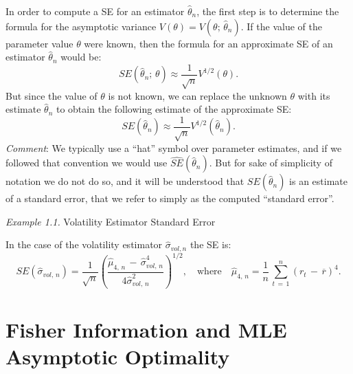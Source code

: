 \documentclass[graybox,envcountchap,sectrefs]{svmono}\usepackage[]{graphicx}\usepackage[]{xcolor}
\begin{document}
\begin{appendices}
In order to compute a SE for an estimator $\hat{\theta}_{n}$, the
first step is to determine the formula for the asymptotic variance
$V\left(\theta\right)=V\left(\theta;\,\hat{\theta}_{n}\right)$. If
the value of the parameter value $\theta$ were known, then the formula
for an approximate SE of an estimator $\hat{\theta}_{n}$ would be:
\begin{equation}
SE\left(\hat{\theta}_{n};\,\theta\right)\approx\frac{1}{\sqrt{n}}V^{1/2}(\theta).
\end{equation}
But since the value of $\theta$ is not known, we can replace the
unknown $\theta$ with its estimate $\hat{\theta}_{n}$ to obtain
the following estimate of the approximate SE:
\begin{equation}
SE\left(\hat{\theta}_{n}\right)\approx\frac{1}{\sqrt{n}}V^{1/2}(\hat{\theta}_{n}).\label{eq: afsSE}
\end{equation}
\emph{Comment}: We typically use a ``hat'' symbol over parameter
estimates, and if we followed that convention we would use $\widehat{SE}\left(\hat{\theta}_{n}\right)$.
But for sake of simplicity of notation we do not do so, and it will
be understood that $SE\left(\hat{\theta}_{n}\right)$ is an estimate
of a standard error, that we refer to simply as the computed ``standard
error''.

\medskip{}

\emph{Example 1.1.} Volatility Estimator Standard Error

In the case of the volatility estimator $\hat{\sigma}_{vol,n}$ the
SE is:
\begin{equation}
SE\left(\hat{\sigma}_{vol,\,n}\right)=\frac{1}{\sqrt{n}}\left(\dfrac{\hat{\mu}_{4,\,n}\,-\,\hat{\sigma}_{vol,\,n}^{4}}{4\hat{\sigma}_{vol,\,n}^{2}}\right)^{1/2},\quad\mathrm{where}\quad\hat{\mu}_{4,\,n}=\frac{1}{n}\,\sum_{t\,=\,1}^{n}\left(r_{t}\,-\,\overline{r}\right)^{4}.
\end{equation}


\section{Fisher Information and MLE Asymptotic Optimality\label{sec: Fisher Info =000026 MLE Optimality}}


\end{appendices}
\end{document}
